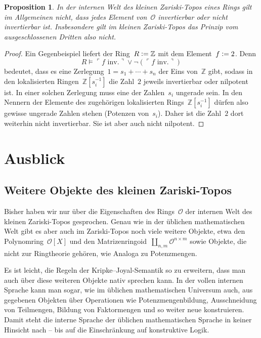 \documentclass[a4paper,ngerman,12pt]{scrartcl}
\theoremstyle{definition}
\theoremstyle{plain}
\newtheorem{prop}[defn]{Proposition}
\theoremstyle{remark}
\newcommand{\ZZ}{\mathbb{Z}}
\renewcommand{\O}{\mathcal{O}}
\renewcommand{\_}{\mathpunct{.}\,}
\newcommand{\?}{\,{:}\,}
\newcommand{\defeq}{\vcentcolon=}
\newcommand{\speak}[1]{\ulcorner\text{#1}\urcorner}
\begin{document}
\begin{prop}In der internen Welt des kleinen Zariski-Topos eines Rings gilt im
Allgemeinen \emph{nicht}, dass jedes Element von~$\O$ invertierbar oder nicht
invertierbar ist. Insbesondere gilt im kleinen Zariski-Topos das Prinzip vom ausgeschlossenen Dritten
also \emph{nicht}.
\end{prop}
\begin{proof}Ein Gegenbeispiel liefert der Ring~$R \defeq \ZZ$ mit dem Element~$f
\defeq 2$. Denn
\[ R \models \speak{$f$ inv.} \vee \neg(\speak{$f$ inv.}) \]
bedeutet, dass es eine Zerlegung~$1 = s_1 + \cdots + s_n$ der Eins
von~$\ZZ$ gibt, sodass in den lokalisierten Ringen~$\ZZ[s_i^{-1}]$ die Zahl~$2$
jeweils invertierbar oder nilpotent ist. In einer solchen Zerlegung muss eine der Zahlen~$s_i$ ungerade
sein. In den Nennern der Elemente des zugehörigen lokalisierten
Rings~$\ZZ[s_i^{-1}]$ dürfen also gewisse ungerade Zahlen stehen (Potenzen
von~$s_i$). Daher ist die Zahl~$2$ dort weiterhin nicht invertierbar. Sie ist
aber auch nicht nilpotent.
\end{proof}


\section{Ausblick}

\subsection*{Weitere Objekte des kleinen Zariski-Topos}

Bisher haben wir nur über die Eigenschaften des Rings~$\O$ der internen Welt
des kleinen Zariski-Topos gesprochen. Genau wie in der üblichen mathematischen
Welt gibt es aber auch im Zariski-Topos noch viele weitere Objekte, etwa
den Polynomring~$\O[X]$ und den Matrizenringoid~$\amalg_{n,m} \O^{n \times
m}$ sowie Objekte, die nicht zur Ringtheorie gehören, wie
Analoga zu Potenzmengen.

Es ist leicht, die Regeln der Kripke--Joyal-Semantik so zu erweitern, dass man
auch über diese weiteren Objekte nativ sprechen kann. In der vollen internen
Sprache kann man sogar, wie im üblichen mathematischen Universum auch, aus
gegebenen Objekten über Operationen wie Potenzmengenbildung, Ausschneidung von
Teilmengen, Bildung von Faktormengen und so weiter neue konstruieren. Damit
steht die interne Sprache der üblichen mathematischen Sprache in keiner
Hinsicht nach -- bis auf die Einschränkung auf konstruktive Logik.
\end{document}
